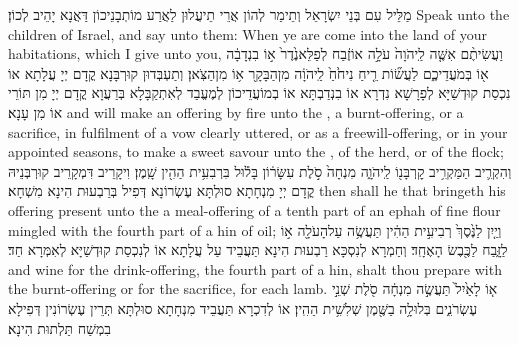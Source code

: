 {מַלֵּיל עִם בְּנֵי יִשְׂרָאֵל וְתֵימַר לְהוֹן אֲרֵי תֵיעֲלוּן לַאֲרַע מוֹתְבָנֵיכוֹן דַּאֲנָא יָהֵיב לְכוֹן׃}
{Speak unto the children of Israel, and say unto them: When ye are come into the land of your habitations, which I give unto you,}{}
{וַעֲשִׂיתֶ֨ם אִשֶּׁ֤ה לַֽיהֹוָה֙ עֹלָ֣ה אוֹ\maqqaf זֶ֔בַח לְפַלֵּא\maqqaf נֶ֙דֶר֙ א֣וֹ בִנְדָבָ֔ה א֖וֹ בְּמֹעֲדֵיכֶ֑ם לַעֲשׂ֞וֹת רֵ֤יחַ נִיחֹ֙חַ֙ לַֽיהֹוָ֔ה מִן\maqqaf הַבָּקָ֖ר א֥וֹ מִן\maqqaf הַצֹּֽאן׃}
{וְתַעְבְּדוּן קוּרְבָּנָא קֳדָם יְיָ עֲלָתָא אוֹ נִכְסַת קוּדְשַׁיָּא לְפָרָשָׁא נִדְרָא אוֹ בִנְדַבְתָּא אוֹ בְמוֹעֲדֵיכוֹן לְמֶעֱבַד לְאִתְקַבָּלָא בְּרַעֲוָא קֳדָם יְיָ מִן תּוֹרֵי אוֹ מִן עָנָא׃}
{and will make an offering by fire unto the \lord, a burnt-offering, or a sacrifice, in fulfilment of a vow clearly uttered, or as a freewill-offering, or in your appointed seasons, to make a sweet savour unto the \lord, of the herd, or of the flock;}{}
{וְהִקְרִ֛יב הַמַּקְרִ֥יב קׇרְבָּנ֖וֹ לַֽיהֹוָ֑ה מִנְחָה֙ סֹ֣לֶת עִשָּׂר֔וֹן בָּל֕וּל בִּרְבִעִ֥ית הַהִ֖ין שָֽׁמֶן׃}
{וִיקָרֵיב דִּמְקָרֵיב קוּרְבְּנֵיהּ קֳדָם יְיָ מִנְחָתָא סוּלְתָּא עֶשְׂרוֹנָא דְּפִיל בְּרַבְעוּת הִינָא מִשְׁחָא׃}
{then shall he that bringeth his offering present unto the \lord\space a meal-offering of a tenth part of an ephah of fine flour mingled with the fourth part of a hin of oil;}{}
{וְיַ֤יִן לַנֶּ֙סֶךְ֙ רְבִיעִ֣ית הַהִ֔ין תַּעֲשֶׂ֥ה עַל\maqqaf הָעֹלָ֖ה א֣וֹ לַזָּ֑בַח לַכֶּ֖בֶשׂ הָאֶחָֽד׃}
{וְחַמְרָא לְנִסְכָּא רַבְעוּת הִינָא תַּעֲבֵיד עַל עֲלָתָא אוֹ לְנִכְסַת קוּדְשַׁיָּא לְאִמְּרָא חַד׃}
{and wine for the drink-offering, the fourth part of a hin, shalt thou prepare with the burnt-offering or for the sacrifice, for each lamb.}{}
{א֤וֹ לָאַ֙יִל֙ תַּעֲשֶׂ֣ה מִנְחָ֔ה סֹ֖לֶת שְׁנֵ֣י עֶשְׂרֹנִ֑ים בְּלוּלָ֥ה בַשֶּׁ֖מֶן שְׁלִשִׁ֥ית הַהִֽין׃}
{אוֹ לְדִכְרָא תַּעֲבֵיד מִנְחָתָא סוּלְתָּא תְּרֵין עֶשְׂרוֹנִין דְּפִילָא בִמְשַׁח תַּלְתוּת הִינָא׃}
